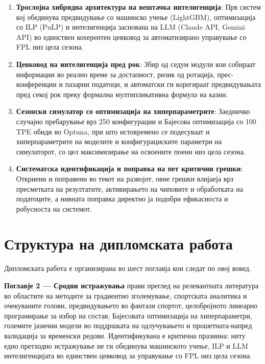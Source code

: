 \begin{enumerate}
  \item \textbf{Трослојна хибридна архитектура на вештачка интелигенција}: Прв систем кој обединува предвидување со машинско учење (LightGBM), оптимизација со ILP (PuLP) и интелигенција заснована на LLM (Claude API, Gemini API) во единствен кохерентен цевковод за автоматизирано управување со FPL низ цела сезона.

  \item \textbf{Цевковод на интелигенција пред рок}: Збир од седум модули кои собираат информации во реално време за достапност, ризик од ротација, прес-конференции и пазарни податоци, и автоматски ги корегираат предвидувањата пред секој рок преку формална мултипликативна формула на казни.

  \item \textbf{Сезонски симулатор со оптимизација на хиперпараметрите}: Заедничко случајно пребарување врз 250 конфигурации и Бајесова оптимизација со 100 TPE обиди во Optuna, при што истовремено се подесуваат и хиперпараметрите на моделите и конфигурациските параметри на симулаторот, со цел максимизирање на освоените поени низ цела сезона.

  \item \textbf{Систематска идентификација и поправка на пет критични грешки}: Откриени и поправени во текот на развојот, овие грешки влијаеја врз пресметката на резултатите, активирањето на чиповите и обработката на податоците, а нивната поправка директно ја подобри ефикасноста и робусноста на системот.
\end{enumerate}

\section{Структура на дипломската работа}

Дипломската работа е организирана во шест поглавја кои следат по овој вовед.

\textbf{Поглавје 2 — Сродни истражувања} прави преглед на релевантната литература во областите на методите за градиентно зголемување, спортската аналитика и очекуваните голови, предвидувањето во фантази спортот, целобројното линеарно програмирање за избор на состав, Бајесовата оптимизација на хиперпараметри, големите јазични модели во поддршката на одлучувањето и прошетната-напред валидација за временски редови. Идентификувана е критична празнина: ниту едно претходно истражување не ги обединува машинското учење, ILP и LLM интелигенцијата во единствен цевковод за управување со FPL низ цела сезона.

